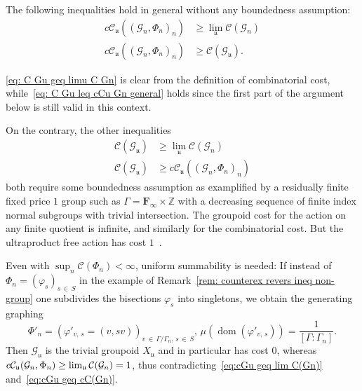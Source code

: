 \documentclass[AHL,Unicode,longabstracts,published]{cedram}
\newcommand{\Zmath}{\mathbb{Z}}
\newcommand{\FF}{\mathbf{F}}
\newcommand{\cost}{\mathcal{C}}
\newcommand{\ccost}{c\mathcal{C}}
\newcommand{\cg}{\mathcal{G}}
\DeclareMathOperator{\dom}{dom}
\newcommand{\ul}{\mathfrak{u}}
\newcommand{\ph}{\varphi}
\begin{document}
\begin{rema}\label{rem: counterex revers ineq non bounded}
The following inequalities hold in general without any boundedness assumption:
\begin{align}\label{eq: C Gu geq limu C Gn}
\ccost_\ul((\cg_n,\Phi_n)_n) &\geq \lim_\ul\cost(\cg_n)\\\label{eq: C Gu leq cCu Gn general}
\ccost_\ul((\cg_n,\Phi_n)_n) &\geq \cost(\cg_\ul).
\end{align}

\eqref{eq: C Gu geq limu C Gn} is clear from the definition of combinatorial cost, while~\eqref{eq: C Gu leq cCu Gn general} holds since the first part of the argument below is still valid in this context.

On the contrary, the other inequalities
\begin{align}
\cost(\cg_\ul) &\geq \lim\limits_\ul \cost(\cg_n)\label{eq:cGu geq lim C(Gn)}
\\
\cost(\cg_\ul) &\geq \ccost_\ul((\cg_n,\Phi_n)_n)\label{eq:cGu geq cC(Gn)}
\end{align}
both require some boundedness assumption as examplified by a residually finite fixed price $1$ group such as $\Gamma=\FF_{\infty}\times \Zmath$ with a decreasing sequence of finite index normal subgroups with trivial intersection. The groupoid cost for the action on any finite quotient is infinite, and similarly for the combinatorial cost. But the ultraproduct free action has cost $1$~\cite[Proposition~VI.23]{Gab-cost}.

Even with $\sup_n \cost(\Phi_n) < \infty$, uniform summability is needed: If instead of $\Phi_n=(\ph_s)_{s\,\in\,S}$ in the example of Remark~\ref{rem: counterex revers ineq non-group} one subdivides the bisections $\ph_s$ into singletons, we obtain the generating graphing
\[
\Phi'_n=(\ph'_{v,\,s}=(v,sv))_{v\,\in\,\Gamma/\Gamma_n,\,s\,\in\,S}, \,\mu(\dom(\ph'_{v,\,s})) = \frac {1}{ [\Gamma:\Gamma_n]}.
\]
Then $\cg_\ul$ is the trivial groupoid $X_\ul$ and in particular has cost $0$, whereas $\ccost_\ul (\cg_n,\Phi_n)\linebreak\geq \lim_\ul \cost(\cg_n) = 1$, thus contradicting~\eqref{eq:cGu geq lim C(Gn)} and~\eqref{eq:cGu geq cC(Gn)}.
\end{rema}
\end{document}
